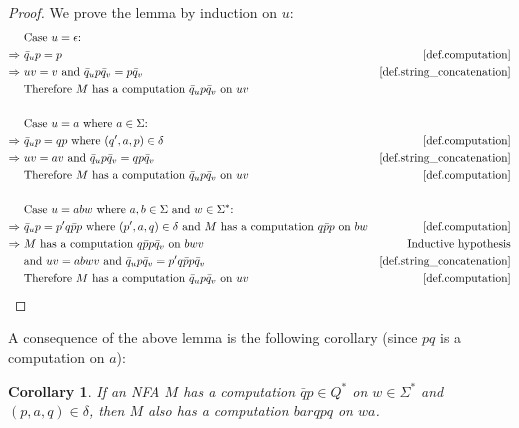\documentclass{report}
\newtheorem{corollary}[theorem]{Corollary}
\theoremstyle{definition}
\begin{document}
\begin{appendices}
\begin{proof}
We prove the lemma by induction on $u$:
\begin{align*}
& \text{Case } u = \epsilon \text{:} \\
\Rightarrow \ & \bar{q}_u p = p
& \text{\cref{def.computation}} \\
\Rightarrow \ & uv = v \text{ and } \bar{q}_u p \bar{q}_v = p \bar{q}_v
& \text{\cref{def.string_concatenation}} \\
& \text{Therefore } M \text{ has a computation } \bar{q}_u p \bar{q}_v \text{ on } uv \\
\\
& \text{Case } u = a \text{ where } a \in \Sigma \text{:} \\
\Rightarrow \ & \bar{q}_u p = qp \text{ where } (q', a, p) \in \delta
& \text{\cref{def.computation}} \\
\Rightarrow \ & uv = av \text{ and } \bar{q}_u p \bar{q}_v = qp \bar{q}_v
& \text{\cref{def.string_concatenation}} \\
& \text{Therefore } M \text{ has a computation } \bar{q}_u p \bar{q}_v \text{ on } uv
& \text{\cref{def.computation}} \\
\\
& \text{Case } u = abw \text{ where } a, b \in \Sigma \text{ and } w \in
\Sigma^{\ast} \text{:} \\
\Rightarrow \ & \bar{q}_u p = p'q \bar{p} p \text{ where } (p', a, q) \in \delta
\text{ and } M \text{ has a computation } q \bar{p} p \text{ on } bw
& \text{\cref{def.computation}} \\
\Rightarrow \ & M \text{ has a computation } q \bar{p} p \bar{q}_v \text{ on } bwv
& \text{Inductive hypothesis} \\
& \text{and } uv = abwv \text{ and }
\bar{q}_u p \bar{q}_v = p'q \bar{p} p \bar{q}_v
& \text{\cref{def.string_concatenation}} \\
& \text{Therefore } M \text{ has a computation } \bar{q}_u p \bar{q}_v \text{ on } uv
& \text{\cref{def.computation}} \\
\end{align*}
\end{proof}

A consequence of the above lemma is the following corollary (since $pq$ is a
computation on $a$):

\begin{corollary} \label{crl.computation_alternative}
If an NFA $M$ has a computation $\bar{q} p \in Q^{\ast}$ on $w \in \Sigma^{\ast}$
and $(p, a, q) \in \delta$, then $M$ also has a computation $bar{q} pq$ on $wa$.
\end{corollary}


\end{appendices}
\end{document}
